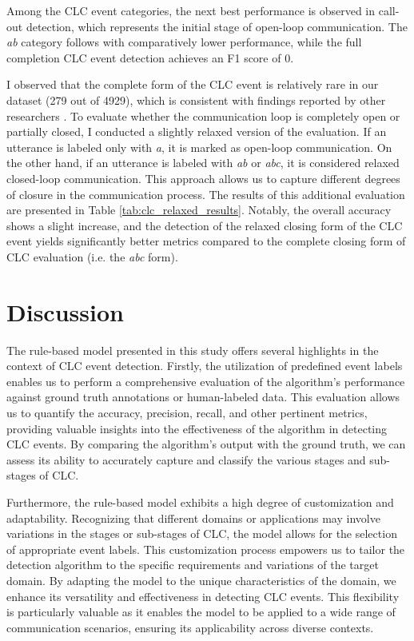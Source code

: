 \documentclass[11pt]{article}
\begin{document}
Among the CLC event categories, the next best performance is observed in call-out detection, which represents the initial stage of open-loop communication. The \textit{ab} category follows with comparatively lower performance, while the full completion CLC event detection achieves an F1 score of 0.

I observed that the complete form of the CLC event is relatively rare in our dataset (279 out of 4929), which is consistent with findings reported by other researchers \citep{hargestam2016trauma, marzuki2019closed}. To evaluate whether the communication loop is completely open or partially closed, I conducted a slightly relaxed version of the evaluation. If an utterance is labeled only with \textit{a}, it is marked as open-loop communication. On the other hand, if an utterance is labeled with \textit{ab} or \textit{abc}, it is considered relaxed closed-loop communication. This approach allows us to capture different degrees of closure in the communication process. The results of this additional evaluation are presented in Table \ref{tab:clc_relaxed_results}. Notably, the overall accuracy shows a slight increase, and the detection of the relaxed closing form of the CLC event yields significantly better metrics compared to the complete closing form of CLC evaluation (i.e. the \textit{abc} form).

\section{Discussion}

The rule-based model presented in this study offers several highlights in the context of CLC event detection. Firstly, the utilization of predefined event labels enables us to perform a comprehensive evaluation of the algorithm's performance against ground truth annotations or human-labeled data. This evaluation allows us to quantify the accuracy, precision, recall, and other pertinent metrics, providing valuable insights into the effectiveness of the algorithm in detecting CLC events. By comparing the algorithm's output with the ground truth, we can assess its ability to accurately capture and classify the various stages and sub-stages of CLC.

Furthermore, the rule-based model exhibits a high degree of customization and adaptability. Recognizing that different domains or applications may involve variations in the stages or sub-stages of CLC, the model allows for the selection of appropriate event labels. This customization process empowers us to tailor the detection algorithm to the specific requirements and variations of the target domain. By adapting the model to the unique characteristics of the domain, we enhance its versatility and effectiveness in detecting CLC events. This flexibility is particularly valuable as it enables the model to be applied to a wide range of communication scenarios, ensuring its applicability across diverse contexts.
\end{document}
